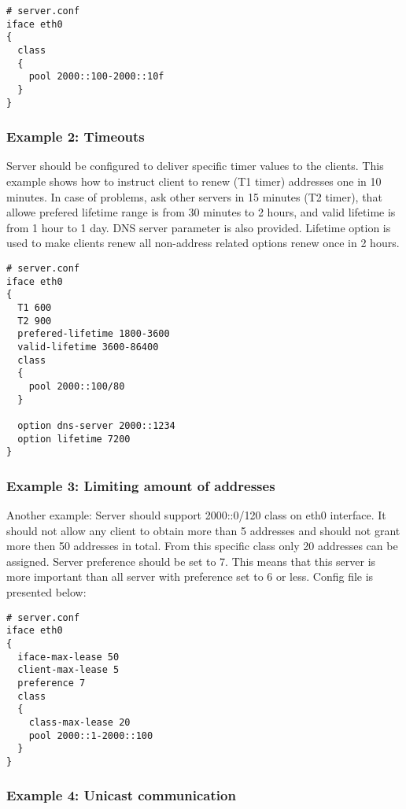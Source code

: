 \begin{lstlisting}
# server.conf
iface eth0
{ 
  class
  {
    pool 2000::100-2000::10f
  } 
}
\end{lstlisting}

\subsubsection{Example 2: Timeouts}
Server should be configured to deliver specific timer values to the
clients. This example shows how to instruct client to renew (T1 timer) 
addresses one in 10 minutes. In case of problems, ask other servers in
15 minutes (T2 timer), that allowe prefered lifetime range is from 30
minutes to 2 hours, and valid lifetime is from 1 hour to 1 day. DNS
server parameter is also provided. Lifetime option is used to make
clients renew all non-address related options renew once in 2 hours.

\begin{lstlisting}
# server.conf
iface eth0 
{
  T1 600
  T2 900
  prefered-lifetime 1800-3600
  valid-lifetime 3600-86400
  class
  {
    pool 2000::100/80
  } 

  option dns-server 2000::1234
  option lifetime 7200
}
\end{lstlisting}

\subsubsection{Example 3: Limiting amount of addresses}
Another example: Server should support 2000::0/120 class on eth0
interface. It should not allow any client to obtain more than 5
addresses and should not grant more then 50 addresses in total. From
this specific class only 20 addresses can be assigned. Server
preference should be set to 7. This means that this server is more
important than all server with preference set to 6 or less. 
Config file is presented below:

\begin{lstlisting}
# server.conf
iface eth0
{
  iface-max-lease 50
  client-max-lease 5
  preference 7
  class
  {
    class-max-lease 20
    pool 2000::1-2000::100
  }
}  
\end{lstlisting}

\subsubsection{Example 4: Unicast communication}
\label{example-server-unicast}

